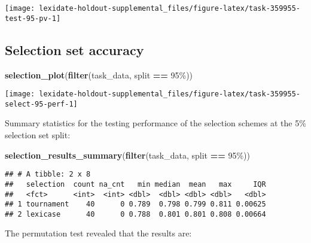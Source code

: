 \documentclass[
]{book}
\newenvironment{Shaded}{\begin{snugshade}}{\end{snugshade}}
\newcommand{\FunctionTok}[1]{\textcolor[rgb]{0.13,0.29,0.53}{\textbf{#1}}}
\newcommand{\NormalTok}[1]{#1}
\newcommand{\SpecialCharTok}[1]{\textcolor[rgb]{0.81,0.36,0.00}{\textbf{#1}}}
\newcommand{\StringTok}[1]{\textcolor[rgb]{0.31,0.60,0.02}{#1}}
\begin{document}
\texttt{[image: lexidate-holdout-supplemental\_files/figure-latex/task-359955-test-95-pv-1]}

\hypertarget{selection-set-accuracy-14}{%
\subsection{Selection set accuracy}\label{selection-set-accuracy-14}}

\begin{Shaded}
\begin{Highlighting}[]
\FunctionTok{selection\_plot}\NormalTok{(}\FunctionTok{filter}\NormalTok{(task\_data, split }\SpecialCharTok{==} \StringTok{\textquotesingle{}95\%\textquotesingle{}}\NormalTok{))}
\end{Highlighting}
\end{Shaded}

\texttt{[image: lexidate-holdout-supplemental\_files/figure-latex/task-359955-select-95-perf-1]}

Summary statistics for the testing performance of the selection schemes at the 5\% selection set split:

\begin{Shaded}
\begin{Highlighting}[]
\FunctionTok{selection\_results\_summary}\NormalTok{(}\FunctionTok{filter}\NormalTok{(task\_data, split }\SpecialCharTok{==} \StringTok{\textquotesingle{}95\%\textquotesingle{}}\NormalTok{))}
\end{Highlighting}
\end{Shaded}

\begin{verbatim}
## # A tibble: 2 x 8
##   selection  count na_cnt   min median  mean   max     IQR
##   <fct>      <int>  <int> <dbl>  <dbl> <dbl> <dbl>   <dbl>
## 1 tournament    40      0 0.789  0.798 0.799 0.811 0.00625
## 2 lexicase      40      0 0.788  0.801 0.801 0.808 0.00664
\end{verbatim}

The permutation test revealed that the results are:
\end{document}
